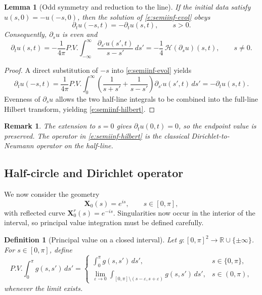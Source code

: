 \documentclass{amsart}
\newcommand{\mX}{\mathbf{X}}
\newcommand{\R}{\mathbb{R}}
\newcommand{\e}{\varepsilon}
\newtheorem{remark}{Remark}[section]
\newtheorem{definition}[theorem]{Definition}
\newtheorem{lemma}[theorem]{Lemma}
\begin{document}
\begin{lemma}[Odd symmetry and reduction to the line]
\label{lem:odd-extension}
If the initial data satisfy $u(s,0)=-u(-s,0)$, then the solution of
\eqref{e:semiinf-evol} obeys
\[
\partial_t u(-s,t)=-\partial_t u(s,t),
\qquad s>0.
\]
Consequently, $\partial_s u$ is even and
\begin{equation}\label{e:semiinf-hilbert}
\partial_t u(s,t)
=
-\frac{1}{4\pi}P.V.\int_{-\infty}^{\infty}
\frac{\partial_{s'}u(s',t)}{s-s'}\,ds'
=
-\frac14\,\mathcal{H}(\partial_s u)(s,t),
\qquad s\neq0.
\end{equation}
\end{lemma}

\begin{proof}
A direct substitution of $-s$ into \eqref{e:semiinf-evol} yields
\[
\partial_t u(-s,t)
=
\frac{1}{4\pi}P.V.\int_0^\infty
\left(\frac{1}{s+s'}+\frac{1}{s-s'}\right)\partial_{s'}u(s',t)\,ds'
=
-\partial_t u(s,t).
\]
Evenness of $\partial_s u$ allows the two half-line integrals to be combined
into the full-line Hilbert transform, yielding
\eqref{e:semiinf-hilbert}.
\end{proof}

\begin{remark}
The extension to $s=0$ gives $\partial_t u(0,t)=0$, so the endpoint value is
preserved. The operator in \eqref{e:semiinf-hilbert} is the classical
Dirichlet-to-Neumann operator on the half-line.
\end{remark}

\subsection{Half-circle and Dirichlet operator}

We now consider the geometry
\[
\mX_0(s)=e^{is},\qquad s\in[0,\pi],
\]
with reflected curve $\mX_0^r(s)=e^{-is}$. Singularities now occur in the
interior of the interval, so principal value integration must be defined
carefully.

\begin{definition}[Principal value on a closed interval]
Let $g:[0,\pi]^2\to\R\cup\{\pm\infty\}$. For $s\in[0,\pi]$, define
\[
P.V.\int_0^\pi g(s,s')\,ds'
=
\begin{cases}
\displaystyle\int_0^\pi g(s,s')\,ds', & s\in\{0,\pi\},\\[1em]
\displaystyle\lim_{\e\to0}
\int_{[0,\pi]\setminus(s-\e,s+\e)}g(s,s')\,ds',
& s\in(0,\pi),
\end{cases}
\]
whenever the limit exists.
\end{definition}
\end{document}
